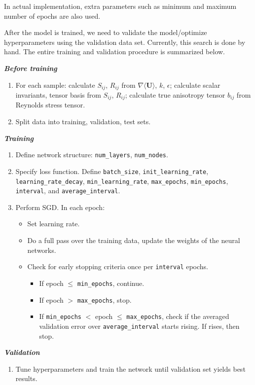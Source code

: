 \documentclass{article}
\numberwithin{equation}{section}
\begin{document}
In actual implementation, extra parameters such as minimum and maximum number of epochs are also used. 

After the model is trained, we need to validate the model/optimize hyperparameters using the validation data set. Currently, this search is done by hand. The entire training and validation procedure is summarized below. 

\begin{tcolorbox}

\textbf{\textit{Before training}}
\begin{enumerate}
    \item For each sample: calculate $S_{ij}$, $R_{ij}$ from $\nabla\langle\mathbf{U}\rangle$, $k$, $\epsilon$; calculate scalar invariants, tensor basis from $S_{ij}$, $R_{ij}$; calculate true anisotropy tensor $b_{ij}$ from Reynolds stress tensor. 
    \item Split data into training, validation, test sets.
\end{enumerate}

\textbf{\textit{Training}}
\begin{enumerate}
    \item Define network structure: \texttt{num\_layers}, \texttt{num\_nodes}. 
    \item Specify loss function. Define \texttt{batch\_size}, \texttt{init\_learning\_rate}, \texttt{learning\_rate\_decay}, \texttt{min\_learning\_rate}, \texttt{max\_epochs}, \texttt{min\_epochs}, \texttt{interval}, and \texttt{average\_interval}.
    \item Perform SGD. In each epoch: 
    \begin{itemize}
        \item Set learning rate. 
        \item Do a full pass over the training data, update the weights of the neural networks.
        \item Check for early stopping criteria once per \texttt{interval} epochs.
        \begin{itemize}
            \item If epoch $\leq$ \texttt{min\_epochs}, continue.
            \item If epoch $>$ \texttt{max\_epochs}, stop.
            \item If \texttt{min\_epochs} $<$ epoch $\leq$ \texttt{max\_epochs}, check if the averaged validation error over \texttt{average\_interval} starts rising. If rises, then stop. 
        \end{itemize}
    \end{itemize}
\end{enumerate}

\textbf{\textit{Validation}}
\begin{enumerate}
    \item Tune hyperparameters and train the network until validation set yields best results.
\end{enumerate}

\end{tcolorbox}
\end{document}
